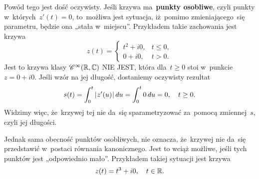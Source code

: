 \documentclass[a4paper,11pt]{article}
\numberwithin{equation}{section}
\begin{document}
Powód tego jest dość oczywisty. Jeśli krzywa ma~\textbf{punkty
  osobliwe}, czyli punkty w~których~$z'( t ) = 0$, to~możliwa jest
sytuacja, iż~pomimo zmieniającego~się parametru, będzie ona „stała
w~miejscu”. Przykładem takie zachowania jest krzywa
\begin{equation}
  \label{eq:Leja-Funkcje-zespolone-30}
  z( t ) =
  \begin{cases}
    t^{ 2 } + i 0, & t \leq 0, \\
    0 + i 0, & t > 0.
  \end{cases}
\end{equation}
Jest to krzywa klasy $\mathcal{C}^{ \infty }( \mathbb{R}, \mathbb{C} )$ NIE JEST, która
dla~$t \geq 0$ stoi w~punkcie $z = 0 + i 0$. Jeśli wzór na jej
długość, dostaniemy oczywisty rezultat
\begin{equation}
  \label{eq:Leja-Funkcje-zespolone-31}
  \begin{split}
    s( t ) = \int_{ 0 }^{ t } | \hspace{0.05em}  z'( u )  \hspace{0.05em} | \, du
    = \int_{ 0 }^{ t } 0 \, du = 0, \quad t \geq 0.
  \end{split}
\end{equation}
Widzimy więc, że~krzywej tej nie da~się sparametryzować za~pomocą
zmiennej~$s$, czyli jej długości.

Jednak sama obecność punktów osobliwych, nie oznacza, że~krzywej nie
da~się przedstawić w~postaci równania kanonicznego. Jest to wciąż
możliwe, jeśli tych punktów jest „odpowiednio mało”. Przykładem takiej
sytuacji jest krzywa
\begin{equation}
  \label{eq:Leja-Funkcje-zespolone-32}
  z( t ) = t^{ 3 } + i 0, \quad
  t \in \mathbb{R}.
\end{equation}
\end{document}
